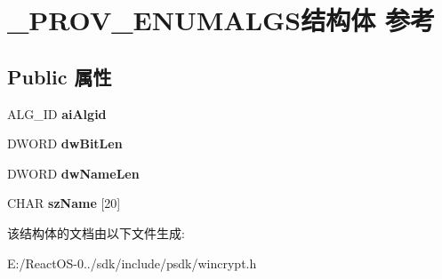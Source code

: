 \hypertarget{struct___p_r_o_v___e_n_u_m_a_l_g_s}{}\section{\+\_\+\+P\+R\+O\+V\+\_\+\+E\+N\+U\+M\+A\+L\+G\+S结构体 参考}
\label{struct___p_r_o_v___e_n_u_m_a_l_g_s}
\subsection*{Public 属性}
\begin{DoxyCompactItemize}
\item 
\mbox{\label{struct___p_r_o_v___e_n_u_m_a_l_g_s_abc4cffdc64be682d036add3f29ecb005}} 
A\+L\+G\+\_\+\+ID {\bfseries ai\+Algid}
\item 
\mbox{\label{struct___p_r_o_v___e_n_u_m_a_l_g_s_a68a33b34ac6884a82641a8e51df71ab8}} 
D\+W\+O\+RD {\bfseries dw\+Bit\+Len}
\item 
\mbox{\label{struct___p_r_o_v___e_n_u_m_a_l_g_s_a535282a4a7390f3badcbe64732c78fc5}} 
D\+W\+O\+RD {\bfseries dw\+Name\+Len}
\item 
\mbox{\label{struct___p_r_o_v___e_n_u_m_a_l_g_s_aea3c77f36e508a663ca8a7580d587e25}} 
C\+H\+AR {\bfseries sz\+Name} \mbox{[}20\mbox{]}
\end{DoxyCompactItemize}


该结构体的文档由以下文件生成\+:\begin{DoxyCompactItemize}
\item 
E\+:/\+React\+O\+S-\/0../sdk/include/psdk/wincrypt.\+h\end{DoxyCompactItemize}
